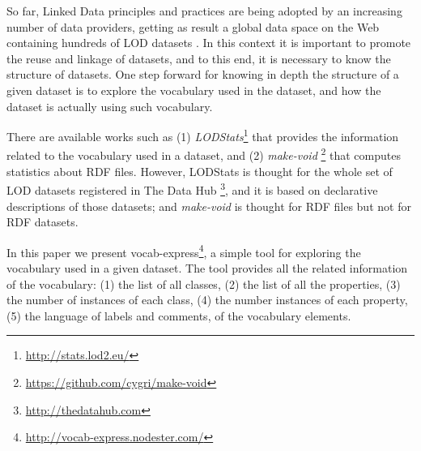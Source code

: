 So far, Linked Data principles and practices are being adopted by an increasing number of data providers, getting as result a global data space on the Web containing hundreds of LOD datasets \cite{Heath_Bizer_2011}. In this context it is important to promote the reuse and linkage of datasets, and to this end, it is necessary to know the structure of datasets. One step forward for knowing in depth the structure of a given dataset is to explore the vocabulary used in the dataset, and how the dataset is actually using such vocabulary.

There are available works such as (1) \emph{LODStats}\footnote{\footnotesize \url{http://stats.lod2.eu/}} that provides the information related to the vocabulary used in a dataset, and (2) \emph{make-void} \footnote{\footnotesize \url{https://github.com/cygri/make-void}} that computes statistics about RDF files. However, LODStats is thought for the whole set of LOD datasets registered in The Data Hub \footnote{\footnotesize \url{http://thedatahub.com}}, and it is based on declarative descriptions of those datasets; and \emph{make-void} is thought for RDF files but not for RDF datasets.

In this paper we present vocab-express\footnote{\footnotesize \url{http://vocab-express.nodester.com/}}, a simple tool for exploring the vocabulary used in a given dataset. The tool provides all the related information of the vocabulary: (1) the list of all classes, (2) the list of all the properties, (3) the number of instances of each class, (4) the number instances of each property, (5) the language of labels and comments, of the vocabulary elements.


